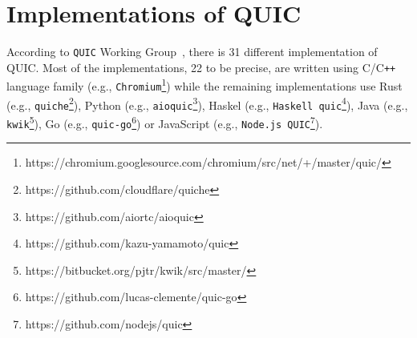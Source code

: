 \documentclass[12pt,a4paper]{report}
\begin{document}
\section{Implementations of QUIC} \label{List_of_QUIC_implementations}
According to \texttt{QUIC} Working Group~\cite{number_of_QUIC_implementations}, there is 31 different implementation of QUIC. Most of the implementations, 22 to be precise, are written using C/C\texttt{++} language family (e.g., \texttt{Chromium}\footnote{https://chromium.googlesource.com/chromium/src/net/+/master/quic/}) while the remaining implementations use Rust (e.g., \texttt{quiche}\footnote{https://github.com/cloudflare/quiche}), Python (e.g., \texttt{aioquic}\footnote{https://github.com/aiortc/aioquic}), Haskel (e.g., \texttt{Haskell quic}\footnote{https://github.com/kazu-yamamoto/quic}), Java (e.g., \texttt{kwik}\footnote{https://bitbucket.org/pjtr/kwik/src/master/}), Go (e.g., \texttt{quic-go}\footnote{https://github.com/lucas-clemente/quic-go}) or JavaScript (e.g., \texttt{Node.js QUIC}\footnote{https://github.com/nodejs/quic}).
\end{document}
